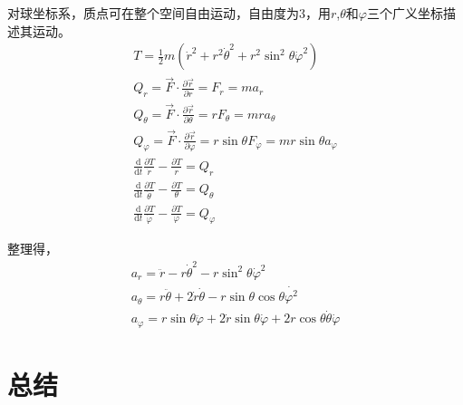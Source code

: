 \documentclass{ctexart}
\begin{document}
    对球坐标系，质点可在整个空间自由运动，自由度为3，用$r$,$\theta$和$\varphi$三个广义坐标描述其运动。
    \begin{gather*}
        T = \frac{1}{2} m (\dot{r}^2+r^2\dot{\theta}^2+r^2\sin^2\theta\dot{\varphi}^2) \\
        Q_r = \vec{F}\cdot\frac{\partial\vec{r}}{\partial r} = F_r = ma_r \\
        Q_{\theta} = \vec{F}\cdot\frac{\partial\vec{r}}{\partial\theta} = rF_{\theta} = mra_{\theta} \\
        Q_{\varphi} = \vec{F}\cdot\frac{\partial\vec{r}}{\partial\varphi} =
        r\sin\theta F_{\varphi} = mr\sin\theta a_{\varphi} \\
        \frac{\mathrm{d}}{\mathrm{d}t}\frac{\partial T}{\dot{r}}-\frac{\partial T}{r} = Q_r \\
        \frac{\mathrm{d}}{\mathrm{d}t}\frac{\partial T}{\dot{\theta}}-
        \frac{\partial T}{\theta} = Q_{\theta} \\
        \frac{\mathrm{d}}{\mathrm{d}t}\frac{\partial T}{\dot{\varphi}}-
        \frac{\partial T}{\varphi} = Q_{\varphi}
    \end{gather*}

    整理得，
    \begin{gather*}
        a_r = \ddot{r}-r\dot{\theta}^2-r\sin^2\theta\dot{\varphi}^2 \\
        a_{\theta} = r\ddot{\theta}+2\dot{r}\dot{\theta}-r\sin\theta\cos\theta\dot{\varphi^2} \\
        a_{\varphi} = r\sin\theta\ddot{\varphi}+2\dot{r}\sin\theta\dot{\varphi}+
        2r\cos\theta\dot{\theta}\dot{\varphi}
    \end{gather*}

    \section{总结}\label{sec:5}
\end{document}
